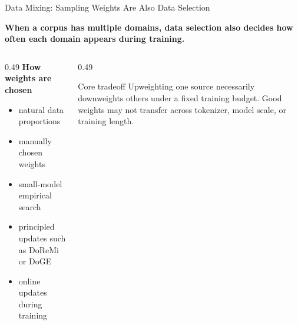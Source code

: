 \documentclass[aspectratio=169]{beamer}
\begin{document}
\begin{frame}{Data Mixing: Sampling Weights Are Also Data Selection}

\textbf{When a corpus has multiple domains, data selection also decides how often each domain appears during training.}

\vspace{0.7em}

\begin{center}
\end{center}

\vspace{0.9em}

\begin{columns}[T,totalwidth=\textwidth]
\begin{column}{0.49\textwidth}
\textbf{How weights are chosen}
\begin{itemize}
  \item natural data proportions
  \item manually chosen weights
  \item small-model empirical search
  \item principled updates such as DoReMi or DoGE
  \item online updates during training
\end{itemize}
\end{column}
\begin{column}{0.49\textwidth}
\begin{alertblock}{Core tradeoff}
Upweighting one source necessarily downweights others under a fixed training budget. Good weights may not transfer across tokenizer, model scale, or training length.
\end{alertblock}
\end{column}
\end{columns}

\end{frame}
\end{document}
